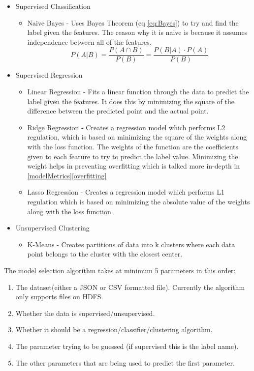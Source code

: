 \documentclass[9pt,twocolumn,twoside]{idsi}
\begin{document}
\begin{itemize}
\item Supervised Classification
	\begin{itemize}
	\item Naive Bayes - Uses Bayes Theorem (eq \ref{eq:Bayes}) to try and find the label given the features. The reason why it is naive is because it assumes independence between all of the features.
    \begin{equation}
    P(A|B) =\frac{P(A \cap B)}{P(B)} = \frac{P(B|A) \cdot P(A)}{P(B)}
    \label{eq:Bayes}
    \end{equation}
	\end{itemize}
\item Supervised Regression
	\begin{itemize}
	\item Linear Regression - Fits a linear function through the data to predict the label given the features. It does this by minimizing the square of the difference between the predicted point and the actual point.
    \item Ridge Regression  - Creates a regression model which performs L2 regulation, which is based on minimizing the square of the weights along with the loss function. The weights of the function are the coefficients given to each feature to try to predict the label value. Minimizing the weight helps in preventing overfitting which is talked more in-depth in \ref{modelMetrics}\ref{overfitting}
    \item Lasso Regression - Creates a regression model which performs L1 regulation which is based on minimizing the absolute value of the weights along with the loss function.
	\end{itemize}
\item Unsupervised Clustering
	\begin{itemize}
	\item K-Means - Creates partitions of data into k clusters where each data point belongs to the cluster with the closest center.
	\end{itemize}
\end{itemize}

The model selection algorithm takes at minimum 5 parameters in this order: 
\begin{enumerate}
\item The dataset(either a JSON or CSV formatted file). Currently the algorithm only supports files on HDFS.
\item Whether the data is supervised/unsupervised.
\item Whether it should be a regression/classifier/clustering algorithm.
\item The parameter trying to be guessed (if supervised this is the label name).
\item The other parameters that are being used to predict the first parameter.
\end{enumerate}
\end{document}
